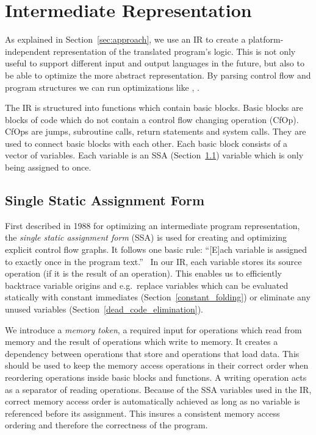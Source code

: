 \documentclass[course=eragp]{aspdoc}
\begin{document}
\section{Intermediate Representation}\label{sec:ir}

As explained in Section~\ref{sec:approach}, we use an IR to create a platform-independent
representation of the translated program's logic. This is not only useful to support different input
and output languages in the future, but also to be able to optimize the more abstract representation.
By parsing control flow and program structures we can run optimizations like
, .

The IR is structured into functions which contain basic blocks. Basic blocks are blocks of code
which do not contain a control flow changing operation (CfOp). CfOps are jumps, subroutine calls,
return statements and system calls. They are used to connect basic blocks with each other. Each
basic block consists of a vector of variables. Each variable is an SSA (Section~\ref{ssa}) variable which is
only being assigned to once.

\subsection{Single Static Assignment Form}\label{ssa}

First described in 1988 for optimizing an intermediate program representation\cite{ssa_proposal},
the \emph{single static assignment form} (SSA) is used for creating and optimizing explicit control
flow graphs. It follows one basic rule: ``[E]ach variable is
assigned to exactly once in the program text.''~\cite{ssa_proposal} In our IR, each variable
stores its source operation (if it is the result of an operation). This enables us to efficiently
backtrace variable origins and e.g.\ replace variables which can be evaluated statically with constant
immediates (Section~\ref{constant_folding}) or eliminate any unused variables (Section~\ref{dead_code_elimination}).

We introduce a \emph{memory token}, a required input for operations which read from memory and the
result of operations which write to memory. It creates a dependency between operations that store
and operations that load data. This should be used to keep the memory access operations
in their correct order when reordering operations inside basic blocks and functions. A writing
operation acts as a separator of reading operations. Because of the SSA variables used in the IR,
correct memory access order is automatically achieved as long as no variable is referenced before
its assignment. This insures a consistent memory access ordering and therefore the correctness of the
program.
\end{document}
